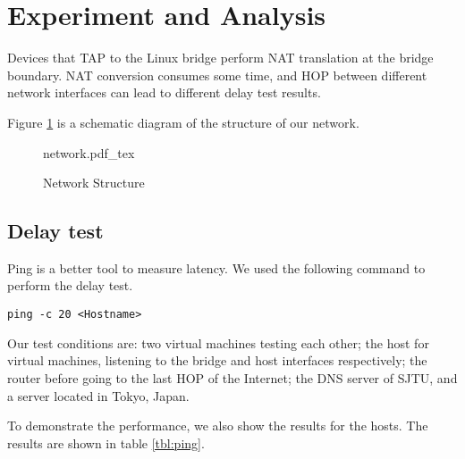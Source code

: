\section{Experiment and Analysis}

Devices that TAP to the Linux bridge perform NAT translation at the bridge boundary.
NAT conversion consumes some time, and HOP between different network interfaces can lead to different delay test results.

Figure \ref{fig:ns} is a schematic diagram of the structure of our network.

\begin{figure}[ht]
    \centering
    \def\svgwidth{0.95\textwidth}
    {network.pdf_tex}
    \caption{Network Structure}
    \label{fig:ns}
\end{figure}

\subsection{Delay test}

Ping is a better tool to measure latency. We used the following command to perform the delay test.

\texttt{ping -c 20 <Hostname>}

Our test conditions are: two virtual machines testing each other; the host for virtual machines, listening to the bridge and host interfaces respectively; the router before going to the last HOP of the Internet; the DNS server of SJTU, and a server located in Tokyo, Japan.

To demonstrate the performance, we also show the results for the hosts. The results are shown in table \ref{tbl:ping}.

